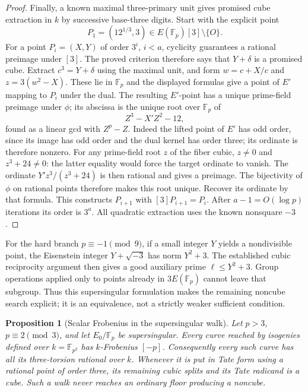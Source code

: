\documentclass[11pt]{article}
\newtheorem{proposition}[theorem]{Proposition}
\theoremstyle{definition}
\theoremstyle{remark}
\begin{document}
\begin{proof}
Finally, a known maximal three-primary unit gives promised
cube extraction in $k$ by successive base-three digits.
Start with the explicit point
\[
 P_1=(12^{1/3},3)\in E(\mathbb F_p)[3]\setminus\{O\}.
\]
For a point $P_i=(X,Y)$ of order $3^i$, $i<a$, cyclicity
guarantees a rational preimage under $[3]$.  The proved
criterion therefore says that $Y+\delta$ is a promised cube.
Extract $c^3=Y+\delta$ using the maximal unit, and form
$w=c+X/c$ and $z=3(w^2-X)$.  These lie in $\mathbb F_p$
and the displayed formulas give a point of $E'$ mapping to
$P_i$ under the dual.  The resulting $E'$-point has a unique prime-field
preimage under $\phi$; its abscissa is the unique root over
$\mathbb F_p$ of
\[
 Z^3-X' Z^2-12,
\]
found as a linear gcd with $Z^p-Z$.
Indeed the lifted point of $E'$ has odd order, since its image
has odd order and the dual kernel has order three; its ordinate
is therefore nonzero.  For any prime-field root $z$ of the
fiber cubic, $z\ne0$ and $z^3+24\ne0$: the latter equality
would force the target ordinate to vanish.  The ordinate
$Y'z^3/(z^3+24)$ is then rational and gives a preimage.
The bijectivity of $\phi$ on rational points therefore makes
this root unique.  Recover its ordinate by that formula.
This constructs $P_{i+1}$ with $[3]P_{i+1}=P_i$.
After $a-1=O(\log p)$ iterations its order is $3^a$.
All quadratic extraction uses the known nonsquare $-3$.
\end{proof}

For the hard branch $p\equiv-1\pmod9$, if a small integer
$Y$ yields a nondivisible point, the Eisenstein integer
$Y+\sqrt{-3}$ has norm $Y^2+3$.  The established cubic
reciprocity argument then gives a good auxiliary prime
$\ell\le Y^2+3$.  Group operations applied only to points
already in $3E(\mathbb F_p)$ cannot leave that subgroup.
Thus this supersingular formulation makes the remaining
noncube search explicit; it is an equivalence, not a
strictly weaker sufficient condition.

\begin{proposition}[Scalar Frobenius in the supersingular walk]
\label{prop:supersingular-walk-scalar}
Let $p>3$, $p\equiv2\pmod3$, and let $E_0/\mathbb F_p$
be supersingular.  Every curve reached by isogenies defined
over $k=\mathbb F_{p^2}$ has $k$-Frobenius $[-p]$.
Consequently every such curve has all its three-torsion
rational over $k$.  Whenever it is put in Tate form using
a rational point of order three, its remaining cubic splits
and its Tate radicand is a cube.  Such a walk never reaches
an ordinary floor producing a noncube.
\end{proposition}
\end{document}
